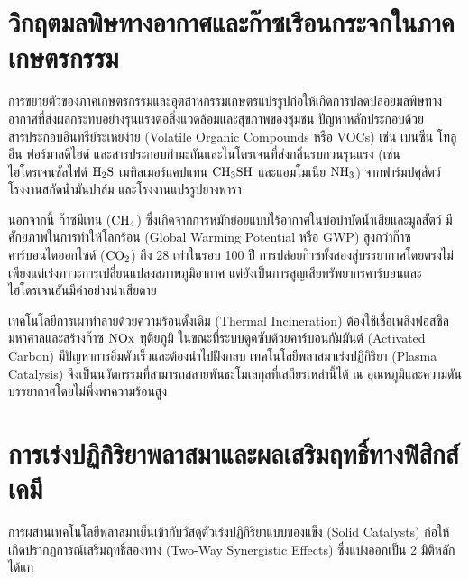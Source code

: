 \clearpage


\section{วิกฤตมลพิษทางอากาศและก๊าซเรือนกระจกในภาคเกษตรกรรม}

การขยายตัวของภาคเกษตรกรรมและอุตสาหกรรมเกษตรแปรรูปก่อให้เกิดการปลดปล่อยมลพิษทางอากาศที่ส่งผลกระทบอย่างรุนแรงต่อสิ่งแวดล้อมและสุขภาพของชุมชน ปัญหาหลักประกอบด้วย สารประกอบอินทรีย์ระเหยง่าย (Volatile Organic Compounds หรือ VOCs) เช่น เบนซีน โทลูอีน ฟอร์มาลดีไฮด์ และสารประกอบกำมะถันและไนโตรเจนที่ส่งกลิ่นรบกวนรุนแรง (เช่น ไฮโดรเจนซัลไฟด์ $\ce{H2S}$ เมทิลเมอร์แคปแทน $\ce{CH3SH}$ และแอมโมเนีย $\ce{NH3}$) จากฟาร์มปศุสัตว์ โรงงานสกัดน้ำมันปาล์ม และโรงงานแปรรูปยางพารา

นอกจากนี้ ก๊าซมีเทน ($\ce{CH4}$) ซึ่งเกิดจากการหมักย่อยแบบไร้อากาศในบ่อบำบัดน้ำเสียและมูลสัตว์ มีศักยภาพในการทำให้โลกร้อน (Global Warming Potential หรือ GWP) สูงกว่าก๊าซคาร์บอนไดออกไซด์ ($\ce{CO2}$) ถึง 28 เท่าในรอบ 100 ปี การปล่อยก๊าซทั้งสองสู่บรรยากาศโดยตรงไม่เพียงแต่เร่งภาวะการเปลี่ยนแปลงสภาพภูมิอากาศ แต่ยังเป็นการสูญเสียทรัพยากรคาร์บอนและไฮโดรเจนอันมีค่าอย่างน่าเสียดาย

เทคโนโลยีการเผาทำลายด้วยความร้อนดั้งเดิม (Thermal Incineration) ต้องใช้เชื้อเพลิงฟอสซิลมหาศาลและสร้างก๊าซ $\ce{NOx}$ ทุติยภูมิ ในขณะที่ระบบดูดซับด้วยคาร์บอนกัมมันต์ (Activated Carbon) มีปัญหาการอิ่มตัวเร็วและต้องนำไปฝังกลบ เทคโนโลยีพลาสมาเร่งปฏิกิริยา (Plasma Catalysis) จึงเป็นนวัตกรรมที่สามารถสลายพันธะโมเลกุลที่เสถียรเหล่านี้ได้ ณ อุณหภูมิและความดันบรรยากาศโดยไม่พึ่งพาความร้อนสูง

\section{การเร่งปฏิกิริยาพลาสมาและผลเสริมฤทธิ์ทางฟิสิกส์เคมี}

การผสานเทคโนโลยีพลาสมาเย็นเข้ากับวัสดุตัวเร่งปฏิกิริยาแบบของแข็ง (Solid Catalysts) ก่อให้เกิดปรากฏการณ์เสริมฤทธิ์สองทาง (Two-Way Synergistic Effects) ซึ่งแบ่งออกเป็น 2 มิติหลัก ได้แก่

